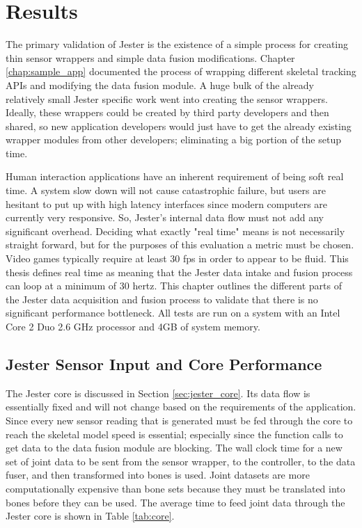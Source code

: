 \chapter{Results}

The primary validation of Jester is the existence of a simple process for creating thin sensor wrappers and simple data fusion modifications. Chapter \ref{chap:sample_app} documented the process of wrapping different skeletal tracking APIs and modifying the data fusion module. A huge bulk of the already relatively small Jester specific work went into creating the sensor wrappers. Ideally, these wrappers could be created by third party developers and then shared, so new application developers would just have to get the already existing wrapper modules from other developers; eliminating a big portion of the setup time.

Human interaction applications have an inherent requirement of being soft real time. A system slow down will not cause catastrophic failure, but users are hesitant to put up with high latency interfaces since modern computers are currently very responsive. So, Jester's internal data flow must not add any significant overhead. Deciding what exactly "real time" means is not necessarily straight forward, but for the purposes of this evaluation a metric must be chosen. Video games typically require at least 30 fps in order to appear to be fluid. This thesis defines real time as meaning that the Jester data intake and fusion process can loop at a minimum of 30 hertz. This chapter outlines the different parts of the Jester data acquisition and fusion process to validate that there is no significant performance bottleneck. All tests are run on a system with an Intel Core 2 Duo 2.6 GHz processor and 4GB of system memory.

\section{Jester Sensor Input and Core Performance}

The Jester core is discussed in Section \ref{sec:jester_core}. Its data flow is essentially fixed and will not change based on the requirements of the application. Since every new sensor reading that is generated must be fed through the core to reach the skeletal model speed is essential; especially since the function calls to get data to the data fusion module are blocking. The wall clock time for a new set of joint data to be sent from the sensor wrapper, to the controller, to the data fuser, and then transformed into bones is used. Joint datasets are more computationally expensive than bone sets because they must be translated into bones before they can be used. The average time to feed joint data through the Jester core is shown in Table \ref{tab:core}.

